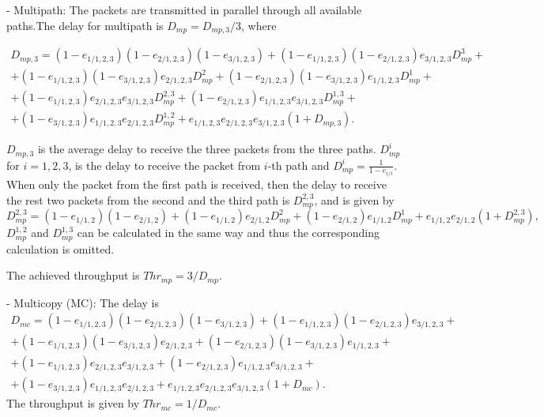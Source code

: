 \documentclass[journal, onecolumn, 12pt]{IEEEtran}
\begin{document}
- Multipath: The packets are transmitted in parallel through all available paths.The delay for multipath is $D_{mp} = D_{mp,3} / 3$, where

\begin{equation}
\begin{aligned}
D_{mp,3} = (1-e_{1/1,2,3})(1-e_{2/1,2,3})(1-e_{3/1,2,3}) + (1-e_{1/1,2,3})(1-e_{2/1,2,3})e_{3/1,2,3} D_{mp}^{3} + \\
+(1-e_{1/1,2,3})(1-e_{3/1,2,3})e_{2/1,2,3} D_{mp}^{2} +(1-e_{2/1,2,3})(1-e_{3/1,2,3})e_{1/1,2,3} D_{mp}^{1}+ \\
+(1-e_{1/1,2,3})e_{2/1,2,3}e_{3/1,2,3} D_{mp}^{2,3}
+(1-e_{2/1,2,3})e_{1/1,2,3}e_{3/1,2,3} D_{mp}^{1,3}+\\
+(1-e_{3/1,2,3})e_{1/1,2,3}e_{2/1,2,3} D_{mp}^{1,2}
+e_{1/1,2,3}e_{2/1,2,3}e_{3/1,2,3}(1+D_{mp,3}).
\end{aligned}
\end{equation}

$D_{mp,3}$ is the average delay to receive the three packets from the three paths. $D_{mp}^{i}$ for $i=1,2,3$, is the delay to receive the packet from $i$-th path and $D_{mp}^{i} = \frac{1}{1-e_{i/i}}$.
When only the packet from the first path is received, then the delay to receive the rest two packets from the second and the third path is $D_{mp}^{2,3}$, and is given by
\begin{equation}
D_{mp}^{2,3} =   (1-e_{1/1,2})(1-e_{2/1,2}) + (1-e_{1/1,2})e_{2/1,2} D_{mp}^{2} + (1-e_{2/1,2})e_{1/1,2} D_{mp}^{1}+ e_{1/1,2}e_{2/1,2}(1+D_{mp}^{2,3}),
\end{equation}
$D_{mp}^{1,2}$ and $D_{mp}^{1,3}$ can be calculated in the same way and thus the corresponding calculation is omitted.

The achieved throughput is $Thr_{mp}=3/D_{mp}$.

- Multicopy (MC): The delay is
\begin{equation}
\begin{aligned}
D_{mc} = (1-e_{1/1,2,3})(1-e_{2/1,2,3})(1-e_{3/1,2,3}) + (1-e_{1/1,2,3})(1-e_{2/1,2,3})e_{3/1,2,3} + \\
+(1-e_{1/1,2,3})(1-e_{3/1,2,3})e_{2/1,2,3} +(1-e_{2/1,2,3})(1-e_{3/1,2,3})e_{1/1,2,3}+ \\
+(1-e_{1/1,2,3})e_{2/1,2,3}e_{3/1,2,3}
+(1-e_{2/1,2,3})e_{1/1,2,3}e_{3/1,2,3}+\\
+(1-e_{3/1,2,3})e_{1/1,2,3}e_{2/1,2,3}
+e_{1/1,2,3}e_{2/1,2,3}e_{3/1,2,3}(1+D_{mc}).
\end{aligned}
\end{equation}
The throughput is given by $Thr_{mc}=1/D_{mc}$.
\end{document}
